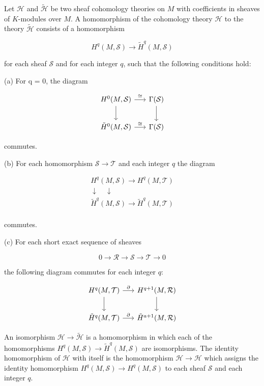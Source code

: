 \begin{definition}\label{thm:5.21}
Let $\mathcal{H}$ and $\tilde{\mathcal{H}}$ be two sheaf cohomology theories on $M$ with coefficients in sheaves of $K$-modules over $M$. A homomorphism of the cohomology theory $\mathcal{H}$ to the theory $\tilde{\mathcal{H}}$ consists of a homomorphism

\begin{equation}
\tag{1}\label{eq:5.21:1}
H^{q}(M,\mathcal{S})\to\tilde{H}^{q}(M,\mathcal{S})
\end{equation}

for each sheaf $\mathcal{S}$ and for each integer $q$, such that the following conditions hold:

(a) For q = 0, the diagram

\[
\begin{tikzcd}[ampersand replacement=\&, column sep=1.6em,row sep=2em]
H^{0}(M,\mathcal{S}) \arrow[r ,"{\cong}"] \arrow[d] \& \Gamma(\mathcal{S}) \arrow[d] \\
\tilde{H}^{0}(M,\mathcal{S}) \arrow[r ,"{\cong}"] \& \Gamma(\mathcal{S})
\end{tikzcd}
\]

commutes.

(b) For each homomorphism  $ \mathcal{S} \to \mathcal{T} $ and each integer  $ q $ the diagram

\[
\begin{matrix}{H^{q}(M,\mathcal{S})\to H^{q}(M,\mathcal{T})}\\ {\downarrow\quad\downarrow}\\ {\tilde{H}^{q}(M,\mathcal{S})\to\tilde{H}^{q}(M,\mathcal{T})}\\ \end{matrix}
\]

commutes.

(c) For each short exact sequence of sheaves

\[
0\to\mathcal{R}\to\mathcal{S}\to\mathcal{T}\to0
\]

the following diagram commutes for each integer $q$:

\[
\begin{tikzcd}[ampersand replacement=\&, column sep=1.6em,row sep=2em]
H^{q}(M,\mathcal{T}) \arrow[r ,"{\partial}"] \arrow[d] \& H^{q+1}(M,\mathcal{R}) \arrow[d] \\
\tilde{H}^{q}(M,\mathcal{T}) \arrow[r ,"{\partial}"] \& \tilde{H}^{a+1}(M,\mathcal{R})
\end{tikzcd}
\]

An isomorphism $\mathcal{H}\to\tilde{\mathcal{H}}$ is a homomorphism in which each of the homomorphisms $H^{q}(M,\mathcal{S})\to\tilde{H}^{q}(M,\mathcal{S})$ are isomorphisms. The identity homomorphism of $\mathcal{H}$ with itself is the homomorphism $\mathcal{H}\to\mathcal{H}$ which assigns the identity homomorphism $H^{q}(M,\mathcal{S})\to H^{q}(M,\mathcal{S})$ to each sheaf $\mathcal{S}$ and each integer $q$.

\end{definition}

